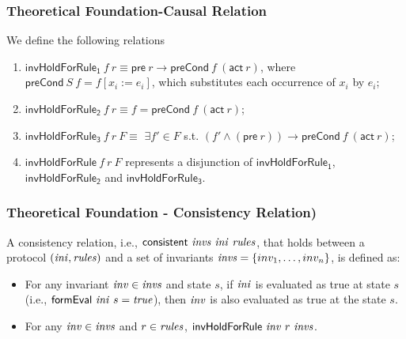 \documentclass{beamer}
\begin{document}
\begin{frame}\frametitle{Theoretical Foundation-Causal Relation}



\begin{definition}
We define the following relations
\begin{enumerate}
\item $\mathsf{invHoldForRule_1} ~f ~r \equiv \mathsf{pre}~ r \longrightarrow \mathsf{preCond}~ f ~(\mathsf{act}~ r)$, where $\mathsf{preCond}~S~f=f[x_i:=e_i]$, which substitutes each
occurrence of $x_i$ by $e_i$;
\item $\mathsf{invHoldForRule_2}~ f~ r \equiv f = \mathsf{preCond}~ f~(\mathsf{act}~ r)$;
\item $\mathsf{invHoldForRule_3}~ f~ r ~F \equiv$  $\exists f' \in F$ s.t.
$(f' \wedge (\mathsf{pre}~ r)) \longrightarrow \mathsf{preCond} ~f ~(\mathsf{act}   ~r)$;
\item $\mathsf{invHoldForRule}~ f~ r ~F$ represents a disjunction of $\mathsf{invHoldForRule_1}$, $\mathsf{invHoldForRule_2}$
and $\mathsf{invHoldForRule_3}$.
\end{enumerate}
\end{definition}
\end{frame}

\begin{frame}\frametitle{Theoretical Foundation - Consistency Relation)}


\begin{definition}
A consistency relation, i.e., $\mathsf{consistent}~ {\it invs} ~{\it ini}~ {\it rules}$,
that holds between a protocol $({\it ini}, {\it rules})$ and
a set of invariants ${\it invs}=\{inv_1,\ldots, inv_n\}$,  is defined as:
%
\begin{itemize}
\item For any invariant ${\it inv} \in {\it invs}$ and state $s$,
if ${\it ini}$ is
evaluated as true at state $s$
(i.e., $\mathsf{formEval}~{\it ini}~s={\it true}$), then ${\it inv}$ is also evaluated as true at the state $s$.

\item For any ${\it inv} \in {\it invs}$ and $r\in {\it rules}$,
$\mathsf{invHoldForRule}~{\it inv}~r~{\it invs}$.
\end{itemize}
\end{definition}


\end{frame}
\end{document}
